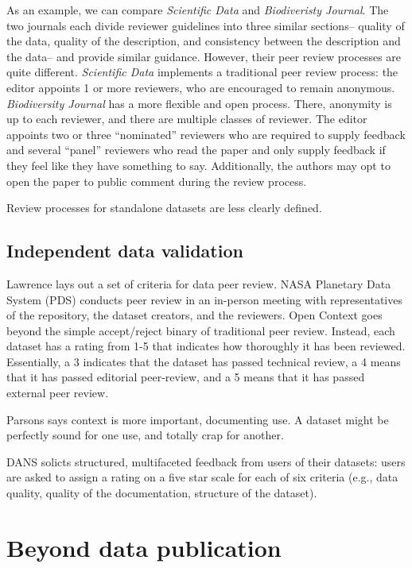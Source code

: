 \documentclass[10pt,twocolumn]{article}
\begin{document}
As an example, we can compare \emph{Scientific Data} and \emph{Biodiveristy Journal}.
The two journals each divide reviewer guidelines into three similar sections– quality of the data, quality of the description, and consistency between the description and the data– and provide similar guidance.
However, their peer review processes are quite different.
\emph{Scientific Data} implements a traditional peer review process: the editor appoints 1 or more reviewers, who are encouraged to remain anonymous.
\emph{Biodiversity Journal} has a more flexible and open process.
There, anonymity is up to each reviewer, and there are multiple classes of reviewer.
The editor appoints two or three ``nominated'' reviewers who are required to supply feedback and several ``panel'' reviewers who read the paper and only supply feedback if they feel like they have something to say.
Additionally, the authors may opt to open the paper to public comment during the review process.

Review processes for standalone datasets are less clearly defined. 

\subsection*{Independent data validation}\label{post-publication-review}
Lawrence lays out a set of criteria for data peer review.\cite{lawrence_citation_2011}
NASA Planetary Data System (PDS) conducts peer review in an in-person meeting with representatives of the repository, the dataset creators, and the reviewers.
Open Context goes beyond the simple accept/reject binary of traditional peer review.\cite{kansa_we_2013} 
Instead, each dataset has a rating from 1-5 that indicates how thoroughly it has been reviewed. 
Essentially, a 3 indicates that the dataset has passed technical review, a 4 means that it has passed editorial peer-review, and a 5 means that it has passed external peer review. 

Parsons says context is more important, documenting use.
A dataset might be perfectly sound for one use, and totally crap for another. 

DANS solicts structured, multifaceted feedback from users of their datasets: users are asked to assign a rating on a five star scale for each of six criteria (e.g., data quality, quality of the documentation, structure of the dataset).\cite{grootveld_data_2011,grootveld_peer-reviewed_2012} 


\section*{Beyond data publication}\label{beyond-data-publication}
\end{document}
